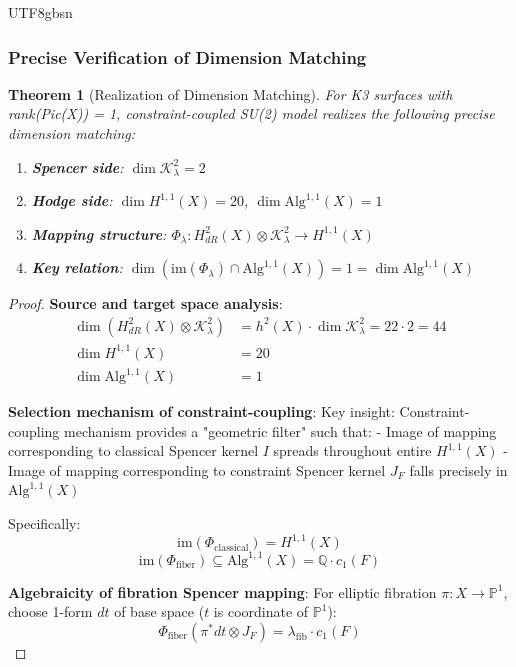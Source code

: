 \documentclass[a4paper,12pt]{extarticle}
\newtheorem{theorem}{Theorem}[section]
\theoremstyle{definition}
\begin{document}
\begin{CJK}{UTF8}{gbsn}
\subsubsection{Precise Verification of Dimension Matching}
\label{subsubsec:exact_dimension_matching}

\begin{theorem}[Realization of Dimension Matching]
\label{thm:perfect_dimension_matching_su2}
For K3 surfaces with rank(Pic(X)) = 1, constraint-coupled SU(2) model realizes the following precise dimension matching:

\begin{enumerate}
\item \textbf{Spencer side}: $\dim \mathcal{K}^2_\lambda = 2$
\item \textbf{Hodge side}: $\dim H^{1,1}(X) = 20$, $\dim \text{Alg}^{1,1}(X) = 1$
\item \textbf{Mapping structure}: $\Phi_\lambda: H^2_{dR}(X) \otimes \mathcal{K}^2_\lambda \to H^{1,1}(X)$
\item \textbf{Key relation}: $\dim(\text{im}(\Phi_\lambda) \cap \text{Alg}^{1,1}(X)) = 1 = \dim \text{Alg}^{1,1}(X)$
\end{enumerate}
\end{theorem}

\begin{proof}
\textbf{Source and target space analysis}:
\begin{align}
\dim(H^2_{dR}(X) \otimes \mathcal{K}^2_\lambda) &= h^2(X) \cdot \dim \mathcal{K}^2_\lambda = 22 \cdot 2 = 44\\
\dim H^{1,1}(X) &= 20\\
\dim \text{Alg}^{1,1}(X) &= 1
\end{align}

\textbf{Selection mechanism of constraint-coupling}:
Key insight: Constraint-coupling mechanism provides a "geometric filter" such that:
- Image of mapping corresponding to classical Spencer kernel $I$ spreads throughout entire $H^{1,1}(X)$
- Image of mapping corresponding to constraint Spencer kernel $J_F$ falls precisely in $\text{Alg}^{1,1}(X)$

Specifically:
$$\text{im}(\Phi_{\text{classical}}) = H^{1,1}(X)$$
$$\text{im}(\Phi_{\text{fiber}}) \subseteq \text{Alg}^{1,1}(X) = \mathbb{Q} \cdot c_1(F)$$

\textbf{Algebraicity of fibration Spencer mapping}:
For elliptic fibration $\pi: X \to \mathbb{P}^1$, choose 1-form $dt$ of base space ($t$ is coordinate of $\mathbb{P}^1$):
$$\Phi_{\text{fiber}}(\pi^*dt \otimes J_F) = \lambda_{\text{fib}} \cdot c_1(F)$$


\end{proof}
\end{CJK}
\end{document}
